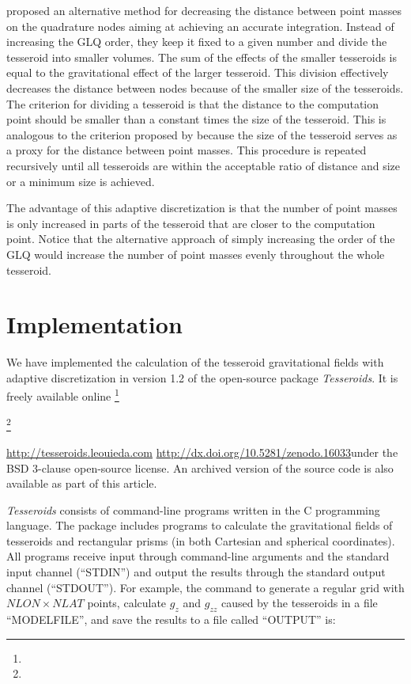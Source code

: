 \citet{li2011} proposed an alternative method
for decreasing the distance between point masses on the quadrature nodes
aiming at achieving an accurate integration.
Instead of increasing the GLQ order,
they keep it fixed to a given number
and divide the tesseroid into smaller volumes.
The sum of the effects of the smaller tesseroids
is equal to the gravitational effect of the larger tesseroid.
This division effectively decreases
the distance between nodes because
of the smaller size of the tesseroids.
The criterion for dividing a tesseroid is that the distance to the computation point
should be smaller than a constant times the size of the tesseroid.
This is analogous to the criterion proposed by \citet{ku1977}
because the size of the tesseroid serves as a proxy
for the distance between point masses.
This procedure is repeated recursively
until all tesseroids are within the acceptable
ratio of distance and size or a minimum size is achieved.

The advantage of this adaptive discretization is
that the number of point masses is only increased
in parts of the tesseroid that are
closer to the computation point.
Notice that the alternative approach of
simply increasing the order of the GLQ
would increase the number of point masses
evenly throughout the whole tesseroid.


\section{Implementation}

We have implemented the calculation of
the tesseroid gravitational fields
with adaptive discretization
in version 1.2 of the open-source package \emph{Tesseroids}.
It is freely available online
\DIFdelbegin \footnote{}%
\addtocounter{footnote}{-1}%
\footnote{}
\addtocounter{footnote}{-1}%
\DIFdelend \DIFaddbegin \DIFadd{(}\url{http://tesseroids.leouieda.com} \url{http://dx.doi.org/10.5281/zenodo.16033}\DIFadd{)
}\DIFaddend under the BSD 3-clause open-source license.
An archived version of the source code
is also available as part of this article.

\emph{Tesseroids} consists of command-line programs
written in the C programming language.
The package includes programs to calculate
the gravitational fields of tesseroids and
rectangular prisms (in both Cartesian and spherical coordinates).
All programs receive input through
command-line arguments and the standard input channel (``STDIN'')
and output the results through the standard output channel (``STDOUT'').
For example,
the command to generate a regular grid with $NLON \times NLAT$ points,
 calculate $g_z$ and $g_{zz}$ caused by
the tesseroids in a file ``MODELFILE'',
and save the results to a file called ``OUTPUT''
is:

